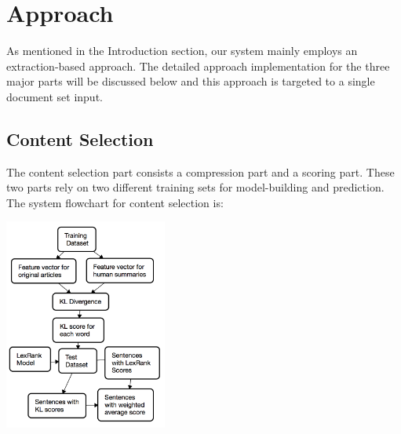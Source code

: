 \documentclass[11pt]{article}
\begin{document}
\section{Approach}

As mentioned in the Introduction section, our system mainly employs an extraction-based approach. The detailed approach implementation for the three major parts will be discussed below and this approach is targeted to a single document set input.

\subsection{Content Selection}
The content selection part consists a compression part and a scoring part. These two parts rely on two different training sets for model-building and prediction. The system flowchart for content selection is:
\begin{center}
\includegraphics[width=0.4\textwidth]{cs_flow.png}
\end{center}
\end{document}
